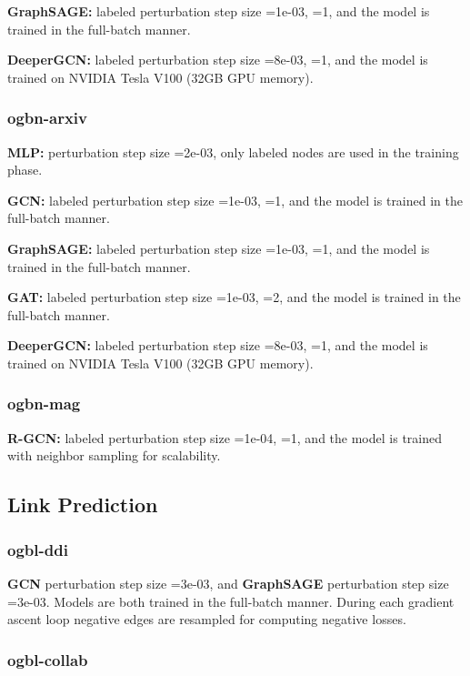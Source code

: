 \documentclass[11pt]{article}
\begin{document}
\textbf{GraphSAGE:} labeled perturbation step size =1e-03, =1, and the model is trained in the full-batch manner.

\textbf{DeeperGCN:} labeled perturbation step size =8e-03, =1, and the model is trained on NVIDIA Tesla V100 (32GB GPU memory).

\subsubsection{ogbn-arxiv}

\textbf{MLP:} perturbation step size =2e-03, only labeled nodes are used in the training phase.

\textbf{GCN:} labeled perturbation step size =1e-03, =1, and the model is trained in the full-batch manner.

\textbf{GraphSAGE:} labeled perturbation step size =1e-03, =1, and the model is trained in the full-batch manner.

\textbf{GAT:} labeled perturbation step size =1e-03, =2, and the model is trained in the full-batch manner.

\textbf{DeeperGCN:} labeled perturbation step size =8e-03, =1, and the model is trained on NVIDIA Tesla V100 (32GB GPU memory).

\subsubsection{ogbn-mag}

\textbf{R-GCN:} labeled perturbation step size =1e-04, =1, and the model is trained with neighbor sampling for scalability.

\subsection{Link Prediction}

\subsubsection{ogbl-ddi}

\textbf{GCN} perturbation step size =3e-03, and \textbf{GraphSAGE} perturbation step size =3e-03. Models are both trained in the full-batch manner. During each gradient ascent loop negative edges are resampled for computing negative losses. 

\subsubsection{ogbl-collab}
\end{document}

